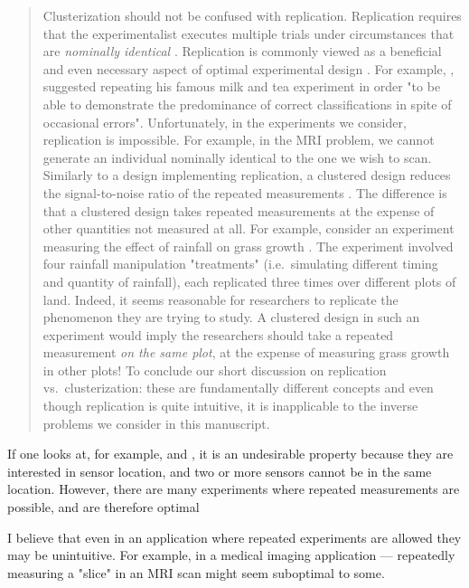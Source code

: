 \begin{quote} %
  Clusterization should not be confused with replication. Replication
requires that the experimentalist executes multiple trials under
circumstances that are \emph{nominally identical} \cite[Section
  1.2.4]{morris2011}. Replication is commonly viewed as a beneficial
and even necessary aspect of optimal experimental design
\cite{fisher1949design, morris2011, schafer2001replication}.
For example, \cite{fisher1949design}, suggested repeating his famous
milk and tea experiment in order "to be able to demonstrate the
predominance of correct classifications in spite of occasional
errors". Unfortunately, in the experiments we consider, replication is
impossible. For example, in the MRI problem, we cannot generate an
individual nominally identical to the one we wish to scan.
\newline
Similarly to a design implementing replication, a clustered design
reduces the signal-to-noise ratio of the repeated measurements
\cite{telford2007brief}. The difference is that a clustered design
takes repeated measurements at the expense of other quantities not
measured at all. For example, consider an experiment measuring the
effect of rainfall on grass growth \cite{fay2000rainfall}. The
experiment involved four rainfall manipulation "treatments"
(i.e.~simulating different timing and quantity of rainfall), each
replicated three times over different plots of land. Indeed, it seems
reasonable for researchers to replicate the phenomenon they are trying
to study. A clustered design in such an experiment would imply the
researchers should take a repeated measurement \emph{on the same
plot}, at the expense of measuring grass growth in other plots!
\newline
To conclude our short discussion on replication vs.~clusterization:
these are fundamentally different concepts and even though replication
is quite intuitive, it is inapplicable to the inverse problems we
consider in this manuscript.
\end{quote}



\RC If one looks at, for example, \cite{fedorov1996} and
\cite{nyberg2012}, it is an undesirable property because they are
interested in sensor location, and two or more sensors cannot be in
the same location. However, there are many experiments where repeated
measurements are possible, and are therefore optimal

\AR I believe that even in an application where repeated experiments
are allowed they may be unintuitive. For example, in a medical imaging
application --- repeatedly measuring a "slice" in an MRI scan might
seem suboptimal to some.


